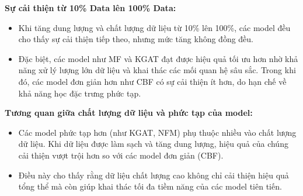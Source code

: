 \textbf{Sự cải thiện từ 10\% Data lên 100\% Data:}
\begin{itemize}
    \item Khi tăng dung lượng và chất lượng dữ liệu từ 10\% lên 100\%, các model đều cho thấy sự cải thiện tiếp theo, nhưng mức tăng không đồng đều.
    \item Đặc biệt, các model như MF và KGAT đạt được hiệu quả tối ưu hơn nhờ khả năng xử lý lượng lớn dữ liệu và khai thác các mối quan hệ sâu sắc. Trong khi đó, các model đơn giản hơn như CBF có sự cải thiện ít hơn, do hạn chế về khả năng học đặc trưng phức tạp.
\end{itemize}
\textbf{Tương quan giữa chất lượng dữ liệu và phức tạp của model:}
\begin{itemize}
    \item Các model phức tạp hơn (như KGAT, NFM) phụ thuộc nhiều vào chất lượng dữ liệu. Khi dữ liệu được làm sạch và tăng dung lượng, hiệu quả của chúng cải thiện vượt trội hơn so với các model đơn giản (CBF).
    \item Điều này cho thấy rằng dữ liệu chất lượng cao không chỉ cải thiện hiệu quả tổng thể mà còn giúp khai thác tối đa tiềm năng của các model tiên tiến.
\end{itemize}
